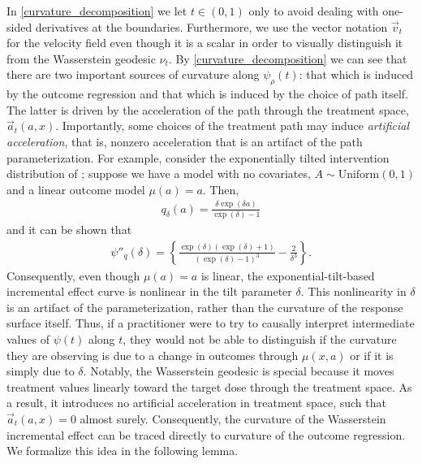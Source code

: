 \documentclass[11pt,twoside]{article}
\theoremstyle{definition}
\theoremstyle{remark}
\begin{document}
In \cref{curvature_decomposition} we let $t \in (0, 1)$ only to avoid dealing with one-sided derivatives at the boundaries. Furthermore, we use the vector notation $\vec{v}_t$ for the velocity field even though it is a scalar in order to visually distinguish it from the Wasserstein geodesic $\nu_t$. By \cref{curvature_decomposition} we can see that there are two important sources of curvature along $\psi_\rho(t)$: that which is induced by the outcome regression and that which is induced by the choice of path itself. The latter is driven by the acceleration of the path through the treatment space, $\vec{a}_t(a, x)$. Importantly, some choices of the treatment path may induce \textit{artificial acceleration}, that is, nonzero acceleration that is an artifact of the path parameterization. For example, consider the exponentially tilted intervention distribution of \cite{diaz2020causal, schindl2024incremental}; suppose we have a model with no covariates, $A \sim \text{Uniform}(0, 1)$ and a linear outcome model $\mu(a) = a$. Then, 
\begin{align*}
    q_\delta(a) = \frac{\delta \exp(\delta a)}{\exp(\delta) - 1}
\end{align*}
and it can be shown that
\begin{align*}
    \psi''_{q}(\delta) = \left\{\frac{\exp( \delta)(\exp(\delta) +1)}{(\exp(\delta)-1)^3} -\frac{2}{\delta^3} \right\}.
\end{align*}
Consequently, even though $\mu(a) = a$ is linear, the exponential-tilt-based incremental effect curve is nonlinear in the tilt parameter $\delta$. This nonlinearity in $\delta$ is an artifact of the parameterization, rather than the curvature of the response surface itself. Thus, if a practitioner were to try to causally interpret intermediate values of $\psi(t)$ along $t$, they would not be able to distinguish if the curvature they are observing is due to a change in outcomes through $\mu(x, a)$ or if it is simply due to $\delta$. Notably, the Wasserstein geodesic is special because it moves treatment values linearly toward the target dose through the treatment space. As a result, it introduces no artificial acceleration in treatment space, such that $\vec{a}_t(a, x) = 0$ almost surely. Consequently, the curvature of the Wasserstein incremental effect can be traced directly to curvature of the outcome regression. We formalize this idea in the following lemma.
\end{document}
